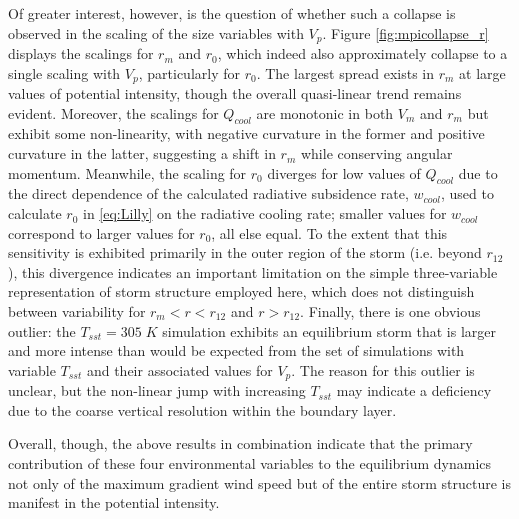 \documentclass[12pt]{article}
\begin{document}
Of greater interest, however, is the question of whether such a collapse is observed in the scaling of the size variables with $V_p$. Figure \ref{fig:mpicollapse_r} displays the scalings for $r_m$ and $r_0$, which indeed also approximately collapse to a single scaling with $V_p$, particularly for $r_0$. The largest spread exists in $r_m$ at large values of potential intensity, though the overall quasi-linear trend remains evident. Moreover, the scalings for $Q_{cool}$ are monotonic in both $V_m$ and $r_m$ but exhibit some non-linearity, with negative curvature in the former and positive curvature in the latter, suggesting a shift in $r_m$ while conserving angular momentum. Meanwhile, the scaling for $r_0$ diverges for low values of $Q_{cool}$ due to the direct dependence of the calculated radiative subsidence rate, $w_{cool}$, used to calculate $r_0$ in \eqref{eq:Lilly} on the radiative cooling rate; smaller values for $w_{cool}$ correspond to larger values for $r_0$, all else equal. To the extent that this sensitivity is exhibited primarily in the outer region of the storm (i.e. beyond $r_{12}$), this divergence indicates an important limitation on the simple three-variable representation of storm structure employed here, which does not distinguish between variability for $r_m < r < r_{12}$ and $r > r_{12}$.  Finally, there is one obvious outlier: the $T_{sst} = 305 \; K$ simulation exhibits an equilibrium storm that is larger and more intense than would be expected from the set of simulations with variable $T_{sst}$ and their associated values for $V_p$. The reason for this outlier is unclear, but the non-linear jump with increasing $T_{sst}$ may indicate a deficiency due to the coarse vertical resolution within the boundary layer.

Overall, though, the above results in combination indicate that the primary contribution of these four environmental variables to the equilibrium dynamics not only of the maximum gradient wind speed but of the entire storm structure is manifest in the potential intensity.

\end{document}
